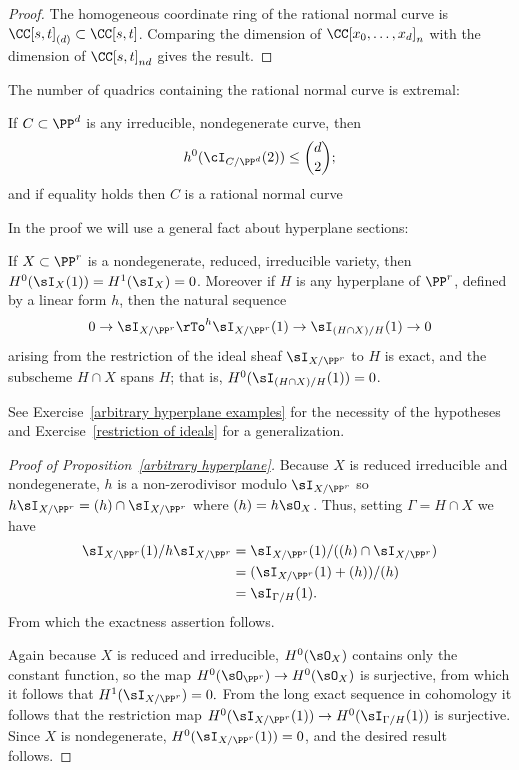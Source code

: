 \begin{proof}
The homogeneous coordinate ring of the rational normal curve is $\CC[s,t]_{(d)}\subset \CC[s,t]$. Comparing the dimension
of $\CC[x_0,\dots,x_d]_n$ with the dimension of $\CC[s,t]_{nd}$ gives the result.
\end{proof}

The number of quadrics containing the rational normal curve is extremal:

\begin{proposition}\label{rnc on most quadrics}
If $C \subset \PP^d$ is any irreducible, nondegenerate curve, then
$$
h^0(\cI_{C/\PP^d}(2)) \leq  \binom{d}{2};
$$
and if equality holds then $C$ is a rational normal curve
\end{proposition}

In the proof we will use a general fact about hyperplane sections:

\begin{proposition}\label{arbitrary hyperplane}
If $X\subset \PP^r$ is a nondegenerate, reduced, irreducible variety, 
then $H^0(\sI_X(1)) = H^1 (\sI_X) = 0$. Moreover if $H$ is any hyperplane of $\PP^r$, defined by
a linear form $h$, then the natural
sequence
$$
0\to \sI_{X/\PP^r} \rTo^h \sI_{X/\PP^r}(1)\to \sI_{(H\cap X)/H}(1)\to 0
$$
arising from the restriction of the ideal sheaf $\sI_{X/\PP^r}$ to $H$ is exact, and the subscheme
$H\cap X$ spans $H$; that is, $H^0(\sI_{(H\cap X)/H}(1)) = 0$.
\end{proposition}

See Exercise~\ref{arbitrary hyperplane examples} for the necessity of the hypotheses
and Exercise~\ref{restriction of ideals} for a generalization. 

\begin{proof}[Proof of Proposition~\ref{arbitrary hyperplane}]
Because $X$ is reduced irreducible and nondegenerate,
$h$ is a non-zerodivisor modulo $\sI_{X/\PP^r}$ so $h\sI_{X/\PP^r} = (h)\cap \sI_{X/\PP^r}$ where
$(h) = h\sO_{X}$. Thus, setting $\Gamma = {H\cap X}$
we have 
$$
\begin{aligned}
\sI_{X/\PP^r}(1)/h\sI_{X/\PP^r} &= \sI_{X/\PP^r}(1)/((h)\cap\sI_{X/\PP^r})\\
 &=(\sI_{X/\PP^r}(1)+(h))/(h)\\
 &= \sI_{\Gamma/H}(1).
\end{aligned}
 $$
 From which the exactness assertion follows.
 
 Again because $X$ is reduced and irreducible, $H^0(\sO_X)$ contains only the constant function, so the map $H^0(\sO_{\PP^r}) \to H^0(\sO_X)$ is surjective, 
from which it follows that $H^1(\sI_{X/\PP^r}) = 0.$ From the long exact sequence in cohomology it follows that
 the restriction map $H^0(\sI_{X/\PP^r}(1))\to H^0(\sI_{\Gamma/H}(1))$ is surjective. Since
$X$ is nondegenerate, $H^0(\sI_{X/\PP^r}(1)) = 0$, and the desired result follows.
\end{proof}


